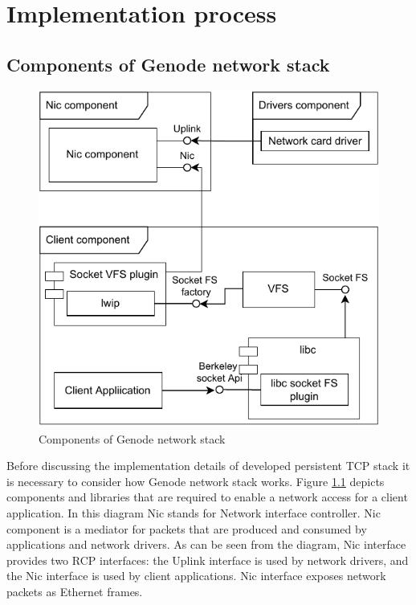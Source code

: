 \chapter{Implementation process}
\label{chap:impl}

\section{Components of Genode network stack}

\begin{figure}
    \centering
    \includegraphics[]{figs/genode-network-stack.pdf}
    \caption{Components of Genode network stack}
    \label{fig:net-components}
\end{figure}

Before discussing the implementation details of developed persistent TCP stack
it is necessary to consider how Genode network stack works. Figure
\ref{fig:net-components} depicts components and libraries that are required to
enable a network access for a client application. In this diagram Nic stands
for Network interface controller. Nic component is a mediator for packets that
are produced and consumed by applications and network drivers. As can be seen
from the diagram, Nic interface provides two RCP interfaces: the Uplink
interface is used by network drivers, and the Nic interface is used by client
applications. Nic interface exposes network packets as Ethernet frames.

